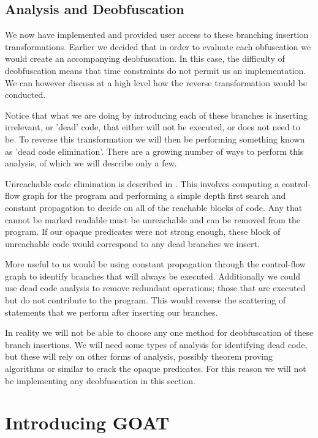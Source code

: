 \documentclass[twoside,a4paper]{report}
\begin{document}
\subsection{Analysis and Deobfuscation}

We now have implemented and provided user access to these branching insertion transformations. Earlier we decided that in order to evaluate each obfuscation
we would create an accompanying deobfuscation. In this case, the difficulty of deobfuscation means that time constraints do not permit us an implementation.
We can however discuss at a high level how the reverse transformation would be conducted.

Notice that what we are doing by introducing each of these branches is inserting irrelevant, or 'dead' code, that either will not be executed, or does not
need to be. To reverse this transformation we will then be performing something known as 'dead code elimination'. There are a growing number of ways to perform
this analysis, of which we will describe only a few.

Unreachable code elimination is described in \cite{codecompact}. This involves computing a control-flow graph for the program and performing a simple depth
first search and constant propagation to decide on all of the reachable blocks of code. Any that cannot be marked readable must be unreachable and can be removed
from the program. If our opaque predicates were not strong enough, these block of unreachable code would correspond to any dead branches we insert.

More useful to us would be using constant propagation through the control-flow graph to identify branches that will always be executed. Additionally we could use
dead code analysis to remove redundant operations; those that are executed but do not contribute to the program. This would reverse the scattering of statements
that we perform after inserting our branches.

In reality we will not be able to choose any one method for deobfuscation of these branch insertions. We will need some types of analysis for identifying dead
code, but these will rely on other forms of analysis, possibly theorem proving algorithms or similar to crack the opaque predicates. For this reason we will not
be implementing any deobfuscation in this section.

\section{Introducing GOAT}
\end{document}
